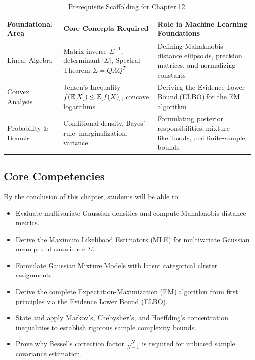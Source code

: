 \begin{table}[htbp]
\centering
\small
\begin{tabularx}{\textwidth}{lXX}
\toprule
\textbf{Foundational Area} & \textbf{Core Concepts Required} & \textbf{Role in Machine Learning Foundations} \\
\midrule
Linear Algebra & Matrix inverse $\Sigma^{-1}$, determinant $|\Sigma|$, Spectral Theorem $\Sigma = Q \Lambda Q^T$ & Defining Mahalanobis distance ellipsoids, precision matrices, and normalizing constants \\
Convex Analysis & Jensen's Inequality $f(\operatorname{\mathbb{E}}[X]) \le \operatorname{\mathbb{E}}[f(X)]$, concave logarithms & Deriving the Evidence Lower Bound (ELBO) for the EM algorithm \\
Probability \& Bounds & Conditional density, Bayes' rule, marginalization, variance & Formulating posterior responsibilities, mixture likelihoods, and finite-sample bounds \\
\bottomrule
\end{tabularx}
\caption{Prerequisite Scaffolding for Chapter 12.}
\label{tab:w12_prereqs}
\end{table}

\subsection{Core Competencies}
By the conclusion of this chapter, students will be able to:
\begin{itemize}
    \item Evaluate multivariate Gaussian densities and compute Mahalanobis distance metrics.
    \item Derive the Maximum Likelihood Estimators (MLE) for multivariate Gaussian mean $\boldsymbol{\mu}$ and covariance $\Sigma$.
    \item Formulate Gaussian Mixture Models with latent categorical cluster assignments.
    \item Derive the complete Expectation-Maximization (EM) algorithm from first principles via the Evidence Lower Bound (ELBO).
    \item State and apply Markov's, Chebyshev's, and Hoeffding's concentration inequalities to establish rigorous sample complexity bounds.
    \item Prove why Bessel's correction factor $\frac{N}{N-1}$ is required for unbiased sample covariance estimation.
\end{itemize}

